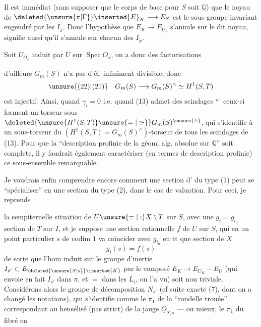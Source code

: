 Il est immédiat (sans supposer que le
corps de base pour $S$ soit $\mathbb Q$) que
le noyau de $\deleted{\unsure{\pi|\Gamma}}\inserted{E}_K\longrightarrow E_S$ est le sous-groupe
invariant engendré par les $I_{\widetilde x}$. Donc
l'hypothèse que $E_K\longrightarrow E_{U_S}$ s'annule
sur le dit noyau, signifie aussi qu'il
s'annule sur chacun des $I_{\widetilde x}$.

Soit  $U_{\underline O_x}$ induit par $U$ sur
$\operatorname{Spec}O_x$, on a donc des factorisations

d'ailleurs $G_m(S)$ n'a pas d'él. infiniment divisible, donc
\[
\unsure{(22)|(21)}\quad G_m(S)\longrightarrow G_m(S)^\wedge\simeq H^1(S,T)
\]
est injectif. Ainsi, quand $\gamma_i=0$ i.e. quand (13) admet des scindages ``'  ceux-ci forment un torseur sous $\deleted{\unsure{H^1(S,T)}\unsure{=|\simeq}}G_m(S)^{\unsure{\wedge}}$, qui s'identifie à un sous-torseur du $(H^1(S,T)=G_m(S)^\wedge)$-torseur de tous les scindages de (13). Pour que la ``description profinie de la géom. alg. absolue sur $\mathbb Q$'' soit complete, il y faudrait également caractériser (en termes de  description profinie) ce sous-ensemble remarquable.

Je voudrais enfin comprendre encore comment une section d' du type (1) peut se ``spécialiser'' en une section du type (2), dans le cas de  valuation. Pour ceci, je reprends

la sempiternelle situation de $U\unsure{=|:}X\setminus T$ sur $S$, avec une $g_i=g_{i_0}$ section de $T$ sur $I$, et je suppose  une section rationnelle $f$ de $U$ sur $S$, qui en un point particulier $s$ de  codim $1$ va coïncider avec $g_{i_0}$ en tt que section de $X$
\[
g_i(s)=f(s)
\]
de sorte que l'hom induit sur le groupe d'inertie $I_{s'}\subset E_{\deleted{\unsure{S|s}}\inserted{K}}$ par le composé $E_K\longrightarrow E_{U_K}-E_U$ (qui envoie en fait $I_{s'}$ dans $\pi$, et $=$ dans les $L_i$, on l'a vu) soit non  triviale. Considérons alors le groupe de décomposition $N_{s'}$ (cf suite exacte (7), dont on a changé les notations), qui s'identifie comme le $\pi_1$ de la ``rondelle trouée'' correspondant au hensélisé (pas strict) de la jauge $\underline O_{S,s}$ --- ou mieux, le $\pi_1$ du fibré en

